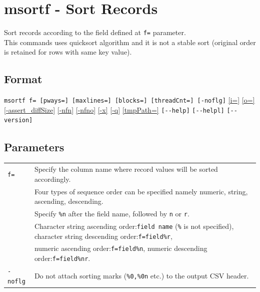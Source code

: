 
%

\section{msortf - Sort Records\label{sect:msortf}}
Sort records according to the field defined at \verb|f=| parameter.\\
This commands uses quicksort algorithm and it is not a stable sort (original order is retained for rows with same key value).  \\

\subsection*{Format}
\verb|msortf f= [pways=] [maxlines=] [blocks=] [threadCnt=] [-noflg]|
\hyperref[sect:option_i]{[i=]}
\hyperref[sect:option_o]{[o=]}
\hyperref[sect:option_assert_diffSize]{[-assert\_diffSize]}
\hyperref[sect:option_nfn]{[-nfn]} 
\hyperref[sect:option_nfno]{[-nfno]}  
\hyperref[sect:option_x]{[-x]}
\hyperref[sect:option_q]{[-q]}
\hyperref[sect:option_tmpPath]{[tmpPath=]} 
\verb|[--help]|
\verb|[--helpl]|
\verb|[--version]|\\
\renewcommand{\figurename}{Figure }

\subsection*{Parameters}
\begin{table}[htbp]
{\small
\begin{tabular}{ll}
\verb|f=|     & Specify the column name where record values will be sorted accordingly. \\
             	& Four types of sequence order can be specified namely numeric, string, ascending, descending. \\
       		    & Specify \verb|%n| after the field name, followed by \verb|n| or \verb|r|. \\
		          & Character string ascending order:\verb|field name| (\verb|%| is not specified), character string descending order:\verb|f=field%r|, \\
		          & numeric ascending order:\verb|f=field%n|, numeric descending order:\verb|f=field%nr|.\\
\verb|-noflg| & Do not attach sorting marks (\verb |%
\end{tabular} 
}
\end{table} 

